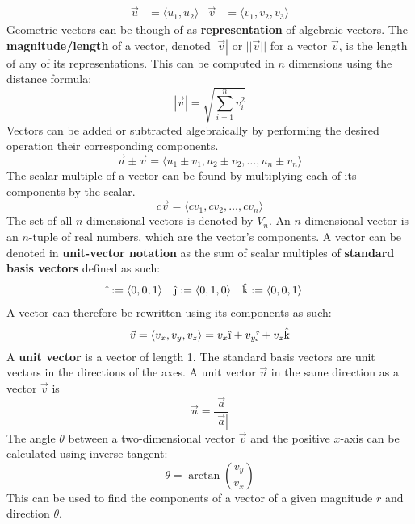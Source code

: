 \documentclass[../Calculus_\Roman{3}]{subfiles}
\begin{document}
				\begin{align*}
					\vec{u} &= \langle u_1, u_2 \rangle & \vec{v} &= \langle v_1, v_2, v_3 \rangle
				\end{align*}
				Geometric vectors can be though of as \textbf{representation} of algebraic vectors.
				The \textbf{magnitude/length} of a vector, denoted $|\vec{v}|$ or $||\vec{v}||$ for a vector $\vec{v}$, is the length of any of its representations. This can be computed in $n$ dimensions using the distance formula:
				\[|\vec{v}| = \sqrt{\sum_{i = 1}^n v_i^2}\]
				Vectors can be added or subtracted algebraically by performing the desired operation their corresponding components.
				\[\vec{u} \pm \vec{v} = \langle u_1 \pm v_1, u_2 \pm v_2, \ldots, u_n \pm v_n \rangle\]
				The scalar multiple of a vector can be found by multiplying each of its components by the scalar.
				\[c\vec{v} = \langle cv_1, cv_2, \ldots, cv_n \rangle\]
				The set of all $n$-dimensional vectors is denoted by $V_n$.
				An $n$-dimensional vector is an $n$-tuple of real numbers, which are the vector's components.
				A vector can be denoted in \textbf{unit-vector notation} as the sum of scalar multiples of \textbf{standard basis vectors} defined as such:
				\begin{align*}
					\vi &:= \langle 0, 0, 1 \rangle &
						\vj &:= \langle 0, 1, 0 \rangle &
						\vk &:= \langle 0, 0, 1 \rangle
				\end{align*}
				A vector can therefore be rewritten using its components as such:
				\[\vec{v} = \langle v_x, v_y, v_z \rangle = v_x\vi + v_y\vj + v_z\vk\]
				A \textbf{unit vector} is a vector of length 1. The standard basis vectors are unit vectors in the directions of the axes. A unit vector $\vec{u}$ in the same direction as a vector $\vec{v}$ is
				\[\vec{u} = \frac{\vec{a}}{|\vec{a}|}\]
				The angle $\theta$ between a two-dimensional vector $\vec{v}$ and the positive $x$-axis can be calculated using inverse tangent:
				\[\theta = \arctan\left(\frac{v_y}{v_x}\right)\]
				This can be used to find the components of a vector of a given magnitude $r$ and direction $\theta$.
\end{document}
